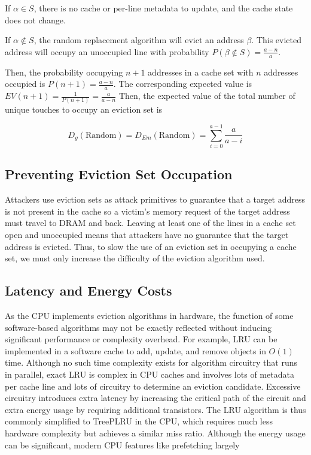 \documentclass[letterpaper, twocolumn]{article}
\begin{document}
If $\alpha \in S$, there is no cache or per-line metadata to update, and the cache state does not change.

If $\alpha \notin S$, the random replacement algorithm will evict an address $\beta$.
This evicted address will occupy an unoccupied line with probability
$P(\beta \notin S) = \frac{a-n}{a}$.

Then, the probability occupying $n+1$ addresses in a cache set with $n$ addresses occupied is $P(n+1) = \frac{a-n}{a}$.
The corresponding expected value is $EV(n+1) = \frac{1}{P(n+1)} = \frac{a}{a-n}$
Then, the expected value of the total number of unique touches to occupy an eviction set is

\begin{equation}\label{RandomExpected}
    D_g(\text{Random}) = D_{Em}(\text{Random}) = \sum_{i=0}^{a-1}{\frac{a}{a-i}}
\end{equation}

\subsection{Preventing Eviction Set Occupation}
Attackers use eviction sets as attack primitives to guarantee that a target address is not present in the cache
so a victim's memory request of the target address must travel to DRAM and back.
Leaving at least one of the lines in a cache set open and unoccupied means that attackers have no guarantee that the target address is evicted.
Thus, to slow the use of an eviction set in occupying a cache set, we must only increase the difficulty of the eviction algorithm used.

\subsection{Latency and Energy Costs}

As the CPU implements eviction algorithms in hardware, the function of some software-based algorithms
may not be exactly reflected without inducing significant performance or complexity overhead.
For example, LRU can be implemented in a software cache to add, update, and remove objects in $O(1)$ time.
Although no such time complexity exists for algorithm circuitry that runs in parallel,
exact LRU is complex in CPU caches and involves lots of metadata per cache line and lots of circuitry to
determine an eviction candidate.
Excessive circuitry introduces extra latency by increasing the critical path of the circuit
and extra energy usage by requiring additional transistors.
The LRU algorithm is thus commonly simplified to TreePLRU in the CPU, which requires much less hardware complexity
but achieves a similar miss ratio.
Although the energy usage can be significant, modern CPU features like prefetching largely

\end{document}
